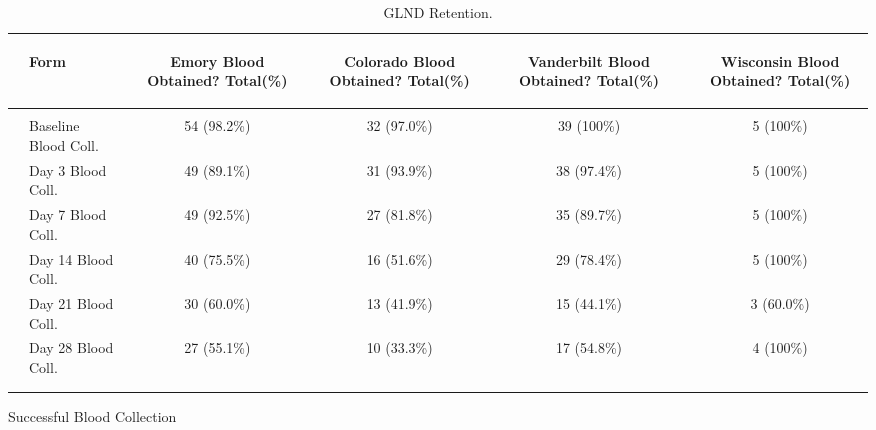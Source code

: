\documentclass[dvips, 10pt]{article}
\begin{document}
\clearpage
\begin{table}[t]
\caption
{ GLND Retention. }
\begin{center}
\begin{tabular}{ @{}l@{}
@{}l@{}@{}p{1.5em}@{}@{}c@{}@{}p{1.5em}@{}@{}c@{}@{}p{1.5em}@{}@{}c@{}@{}p{1.5em}@{}@{}c@{}
}
\hline

& \parbox{6em}{\begin{center}Form\end{center}} && \parbox{6em}{\begin{center}Emory Blood Obtained? Total(\%)\end{center}} && \parbox{6em}{\begin{center}Colorado Blood Obtained? Total(\%)\end{center}} && \parbox{6em}{\begin{center}Vanderbilt Blood Obtained? Total(\%)\end{center}} && \parbox{6em}{\begin{center}Wisconsin Blood Obtained? Total(\%)\end{center}} \\

\hline

\\
& Baseline Blood Coll. && 54 (98.2\%) && 32 (97.0\%) && 39 (100\%) && 5 (100\%) \\
& Day 3 Blood Coll. && 49 (89.1\%) && 31 (93.9\%) && 38 (97.4\%) && 5 (100\%) \\
& Day 7 Blood Coll. && 49 (92.5\%) && 27 (81.8\%) && 35 (89.7\%) && 5 (100\%) \\
& Day 14 Blood Coll. && 40 (75.5\%) && 16 (51.6\%) && 29 (78.4\%) && 5 (100\%) \\
& Day 21 Blood Coll. && 30 (60.0\%) && 13 (41.9\%) && 15 (44.1\%) && 3 (60.0\%) \\
& Day 28 Blood Coll. && 27 (55.1\%) && 10 (33.3\%) && 17 (54.8\%) && 4 (100\%) \\
\\
\hline \\

\end{tabular}

\end{center}
 \end{table}
\clearpage

\begin{table}
\caption{Successful Blood Collection}
\end{table}
\clearpage
\end{document}

